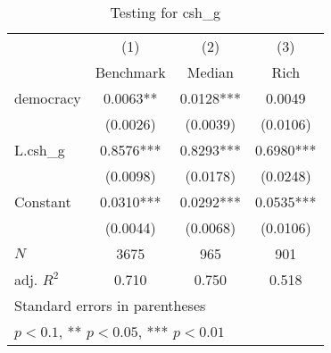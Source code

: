 \begin{table}[htbp]\centering
\def\sym#1{\ifmmode^{#1}\else\(^{#1}\)\fi}
\caption{Testing for csh\_g \label{tab:regression3}}
\begin{tabular}{l*{3}{c}}
\hline\hline
            &\multicolumn{1}{c}{(1)}&\multicolumn{1}{c}{(2)}&\multicolumn{1}{c}{(3)}\\
            &\multicolumn{1}{c}{Benchmark}&\multicolumn{1}{c}{Median}&\multicolumn{1}{c}{Rich}\\
\hline
democracy   &      0.0063** &      0.0128***&      0.0049   \\
            &    (0.0026)   &    (0.0039)   &    (0.0106)   \\
[1em]
L.csh\_g     &      0.8576***&      0.8293***&      0.6980***\\
            &    (0.0098)   &    (0.0178)   &    (0.0248)   \\
[1em]
Constant    &      0.0310***&      0.0292***&      0.0535***\\
            &    (0.0044)   &    (0.0068)   &    (0.0106)   \\
\hline
\(N\)       &        3675   &         965   &         901   \\
adj. \(R^{2}\)&       0.710   &       0.750   &       0.518   \\
\hline\hline
\multicolumn{4}{l}{\footnotesize Standard errors in parentheses}\\
\multicolumn{4}{l}{\footnotesize * \(p<0.1\), ** \(p<0.05\), *** \(p<0.01\)}\\
\end{tabular}
\end{table}
